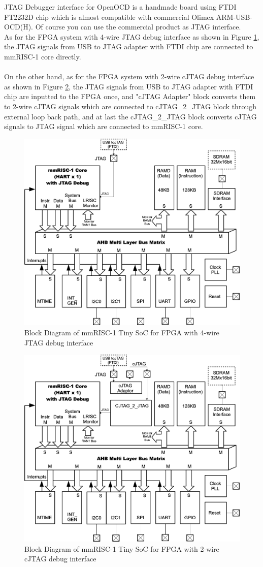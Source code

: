 JTAG Debugger interface for OpenOCD is a handmade board using FTDI FT2232D chip which is almost compatible with commercial Olimex ARM-USB-OCD(H). Of course you can use the commercial product as JTAG interface.\\
As for the FPGA system with 4-wire JTAG debug interface as shown in Figure \ref{fig:BLOCKDIAGRAMJTAG}, the JTAG signals from USB to JTAG adapter with FTDI chip are connected to mmRISC-1 core directly.\\\\

On the other hand, as for the FPGA system with 2-wire cJTAG debug interface as shown in Figure \ref{fig:BLOCKDIAGRAMCJTAG}, the JTAG signals from USB to JTAG adapter with FTDI chip are inputted to the FPGA once, and "cJTAG Adapter" block converts them to 2-wire cJTAG signals which are connected to cJTAG\_2\_JTAG block through external loop back path, and at last the cJTAG\_2\_JTAG block converts cJTAG signals to JTAG signal which are connected to mmRISC-1 core.

\begin{figure}[H]
    \includegraphics[width=0.8\columnwidth]{./Figure/BlockDiagramJTAG.png}
    \caption{Block Diagram of mmRISC-1 Tiny SoC for FPGA with 4-wire JTAG debug interface}
    \label{fig:BLOCKDIAGRAMJTAG}
\end{figure}

\begin{figure}[H]
    \includegraphics[width=0.8\columnwidth]{./Figure/BlockDiagramCJTAG.png}
    \caption{Block Diagram of mmRISC-1 Tiny SoC for FPGA with 2-wire cJTAG debug interface}
    \label{fig:BLOCKDIAGRAMCJTAG}
\end{figure}
